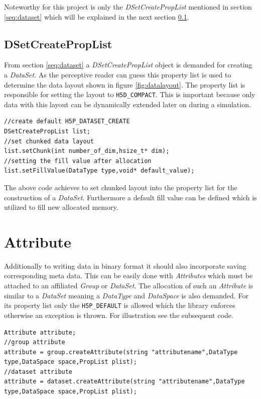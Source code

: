 Noteworthy for this project is only the \textit{DSetCreatePropList} mentioned in section \ref{seq:dataset} which will be explained in the next section \ref{seq:dscpl}.

\subsection{DSetCreatePropList}
\label{seq:dscpl}
From section \ref{seq:dataset} a \textit{DSetCreatePropList} object is demanded for creating a \textit{DataSet}. As the perceptive reader can guess this property list is used to determine the data layout shown in figure \ref{fig:datalayout}. The property list is responsible for setting the layout to \texttt{H5D\_COMPACT}. This is important because only data with this layout can be dynamically extended later on during a simulation. 
\begin{lstlisting}
//create default H5P_DATASET_CREATE
DSetCreatePropList list;
//set chunked data layout
list.setChunk(int number_of_dim,hsize_t* dim);
//setting the fill value after allocation
list.setFillValue(DataType type,void* default_value);
\end{lstlisting}
The above code achieves to set chunked layout into the property list for the construction of a \textit{DataSet}. Furthermore a default fill value can be defined which is utilized to fill new allocated memory.

\section{Attribute}
\label{seq:attribute}
Additionally to writing data in binary format it should also incorporate saving corresponding meta data. This can be easily done with \textit{Attributes} which must be attached to an affiliated \textit{Group} or \textit{DataSet}. The allocation of such an \textit{Attribute} is similar to a \textit{DataSet} meaning a \textit{DataType} and \textit{DataSpace} is also demanded. For its property list only the \texttt{H5P\_DEFAULT} is allowed which the library enforces otherwise an exception is thrown. For illustration see the subsequent code.
\begin{lstlisting}
Attribute attribute;
//group attribute
attribute = group.createAttribute(string "attributename",DataType type,DataSpace space,PropList plist);
//dataset attribute
attribute = dataset.createAttribute(string "attributename",DataType type,DataSpace space,PropList plist);
\end{lstlisting}

